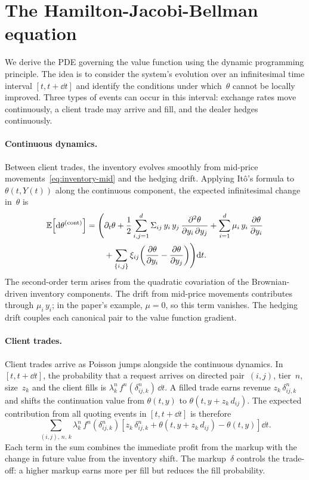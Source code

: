 \section{The Hamilton-Jacobi-Bellman equation}
\label{sec:model-hjb}

We derive the PDE governing the value function using the dynamic programming principle. The idea is to consider the system's evolution over an infinitesimal time interval $[t, t + \dd t]$ and identify the conditions under which~$\theta$ cannot be locally improved. Three types of events can occur in this interval: exchange rates move continuously, a client trade may arrive and fill, and the dealer hedges continuously.

\paragraph{Continuous dynamics.}
Between client trades, the inventory evolves smoothly from mid-price movements~\eqref{eq:inventory-mid} and the hedging drift. Applying It\^{o}'s formula to $\theta(t, Y(t))$ along the continuous component, the expected infinitesimal change in~$\theta$ is
\begin{align*}
  \mathbb{E}\!\left[\mathrm{d}\theta^{(\text{cont})}\right] = \Biggl(&\partial_t\theta + \frac{1}{2}\sum_{i,j=1}^d \Sigma_{ij}\,y_i\,y_j\,\frac{\partial^2\theta}{\partial y_i\,\partial y_j} + \sum_{i=1}^d \mu_i\,y_i\,\frac{\partial\theta}{\partial y_i}\\
  &+ \sum_{\{i,j\}} \xi_{ij}\!\left(\frac{\partial\theta}{\partial y_i} - \frac{\partial\theta}{\partial y_j}\right)\Biggr) \mathrm{d} t.
\end{align*}
The second-order term arises from the quadratic covariation of the Brownian-driven inventory components. The drift from mid-price movements contributes through $\mu_i\,y_i$; in the paper's example, $\mu = 0$, so this term vanishes. The hedging drift couples each canonical pair to the value function gradient.

\paragraph{Client trades.}
Client trades arrive as Poisson jumps alongside the continuous dynamics. In $[t, t + \dd t]$, the probability that a request arrives on directed pair~$(i,j)$, tier~$n$, size~$z_k$ and the client fills is $\lambda^n_k\,f^n(\delta^n_{ij,k})\,\dd t$. A filled trade earns revenue $z_k\,\delta^n_{ij,k}$ and shifts the continuation value from $\theta(t, y)$ to $\theta(t, y + z_k\,d_{ij})$. The expected contribution from all quoting events in $[t, t+\dd t]$ is therefore
\[
  \sum_{(i,j),\,n,\,k} \lambda^n_k\,f^n\!\left(\delta^n_{ij,k}\right) \left[z_k\,\delta^n_{ij,k} + \theta(t, y + z_k\,d_{ij}) - \theta(t,y)\right] \dd t.
\]
Each term in the sum combines the immediate profit from the markup with the change in future value from the inventory shift. The markup~$\delta$ controls the trade-off: a higher markup earns more per fill but reduces the fill probability.

